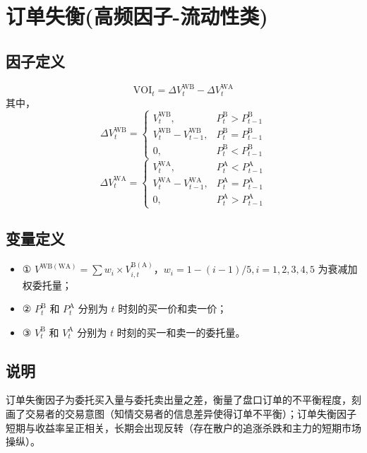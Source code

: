 \documentclass{article}
\begin{document}
\section{订单失衡(高频因子-流动性类)}

\subsection{因子定义}
\begin{equation}
    \mathrm{VOI}_t = \Delta V_t^{\mathrm{WB}} - \Delta V_t^{\mathrm{WA}}
\end{equation}
其中，
\begin{equation}
    \Delta V_t^{\mathrm{WB}} = 
    \begin{cases}
        V_t^{\mathrm{WB}} , & P_t^{\mathrm{B}} > P_{t-1}^{\mathrm{B}} \\
        V_t^{\mathrm{WB}} - V_{t-1}^{\mathrm{WB}}, & P_t^{\mathrm{B}} = P_{t-1}^{\mathrm{B}} \\
        0, & P_t^{\mathrm{B}} < P_{t-1}^{\mathrm{B}}
    \end{cases}
\end{equation}
\begin{equation}
    \Delta V_t^{\mathrm{WA}} = 
    \begin{cases}
        V_t^{\mathrm{WA}}, & P_t^{\mathrm{A}} < P_{t-1}^{\mathrm{A}} \\
        V_t^{\mathrm{WA}} - V_{t-1}^{\mathrm{WA}}, & P_t^{\mathrm{A}} = P_{t-1}^{\mathrm{A}} \\
        0, & P_t^{\mathrm{A}} > P_{t-1}^{\mathrm{A}}
    \end{cases}
\end{equation}

\subsection{变量定义}
\begin{itemize}
    \item ① \( V^{\mathrm{WB}(\mathrm{WA})} = \sum w_i \times V_{i,t}^{\mathrm{B}(\mathrm{A})} \)，\( w_i = 1 - (i-1)/5, i=1,2,3,4,5 \) 为衰减加权委托量；
    \item ② \( P_t^{\mathrm{B}} \) 和 \( P_t^{\mathrm{A}} \) 分别为 \( t \) 时刻的买一价和卖一价；
    \item ③ \( V_t^{\mathrm{B}} \) 和 \( V_t^{\mathrm{A}} \) 分别为 \( t \) 时刻的买一和卖一的委托量。
\end{itemize}

\subsection{说明}
订单失衡因子为委托买入量与委托卖出量之差，衡量了盘口订单的不平衡程度，刻画了交易者的交易意图（知情交易者的信息差异使得订单不平衡）；订单失衡因子短期与收益率呈正相关，长期会出现反转（存在散户的追涨杀跌和主力的短期市场操纵）。
\end{document}
